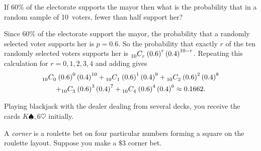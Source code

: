 \documentclass[answers,12pt]{exam}
\newcommand\ncr[2]{\tensor[_{#1}]C{_{#2}}}
\begin{document}
\begin{questions}
\question If $60\%$ of the electorate supports the mayor
then what is the probability that in a random sample
of 10~voters, fewer than half support her?
\begin{solution} Since $60\%$ of the electorate support the mayor,
the probability that a randomly selected voter supports her
is $p=0.6$. So the probability that exactly $r$ of the ten randomly
selected voters
supports her is $\ncr{10}{r}\left(0.6\right)^r\left(0.4\right)^{10-r}$.
Repeating this calculation for $r=0,1,2,3,4$ and adding gives
\begin{multline*}
\ncr{10}{0}\left(0.6\right)^0\left(0.4\right)^{10}
+\ncr{10}{1}\left(0.6\right)^1\left(0.4\right)^9
+\ncr{10}{2}\left(0.6\right)^2\left(0.4\right)^8\\
+\ncr{10}{3}\left(0.6\right)^3\left(0.4\right)^7
+\ncr{10}{4}\left(0.6\right)^4\left(0.4\right)^6
\approx 0.1662.
\end{multline*}
\end{solution}

\question Playing blackjack with the dealer dealing
from several decks, you receive the cards $K\spadesuit,6\heartsuit$
initially.


\question A {\em corner} is a roulette bet
on four particular numbers forming a square
on the roulette layout.
Suppose you make a $\$3$ corner bet.
\begin{parts}

\end{parts}
\end{questions}
\end{document}
